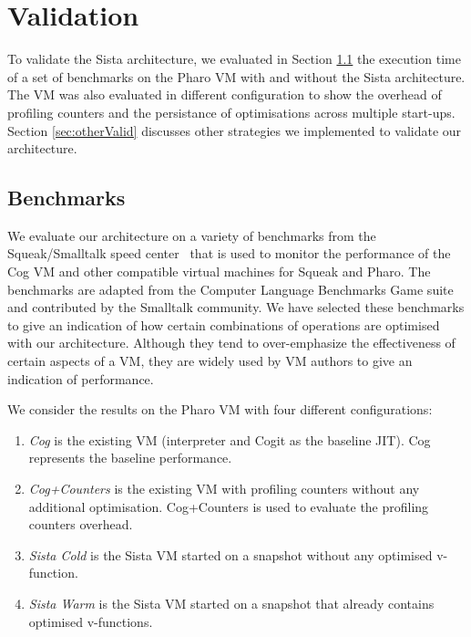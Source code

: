 \documentclass[a4paper,12pt,twoside]{../includes/ThesisStyle}
\begin{document}
\fi

\chapter{Validation}
\label{chap:validation}
\minitoc


To validate the Sista architecture, we evaluated in Section \ref{sec:bench} the execution time of a set of benchmarks on the Pharo VM with and without the Sista architecture. The VM was also evaluated in different configuration to show the overhead of profiling counters and the persistance of optimisations across multiple start-ups. Section \ref{sec:otherValid} discusses other strategies we implemented to validate our architecture.

\section{Benchmarks}
\label{sec:bench}


We evaluate our architecture on a variety of benchmarks from the Squeak/Smalltalk speed center~\cite{Felg16a} that is used to monitor the performance of the Cog VM and other compatible virtual machines for Squeak and Pharo. The benchmarks are adapted from the Computer Language Benchmarks Game suite \cite{GameBenchs} and contributed by the Smalltalk community. We have selected these benchmarks to give an indication of how certain combinations of operations are optimised with our architecture. Although they tend to over-emphasize the effectiveness of certain aspects of a VM, they are widely used by VM authors to give an indication of performance.

We consider the results on the Pharo VM with four different configurations:
\begin{enumerate}
	\item \emph{Cog} is the existing VM (interpreter and Cogit as the baseline JIT). Cog represents the baseline performance.
	\item \emph{Cog+Counters} is the existing VM with profiling counters without any additional optimisation. Cog+Counters is used to evaluate the profiling counters overhead.
	\item \emph{Sista Cold} is the Sista VM started on a snapshot without any optimised v-function.
	\item \emph{Sista Warm} is the Sista VM started on a snapshot that already contains optimised v-functions.
\end{enumerate}
\end{document}
